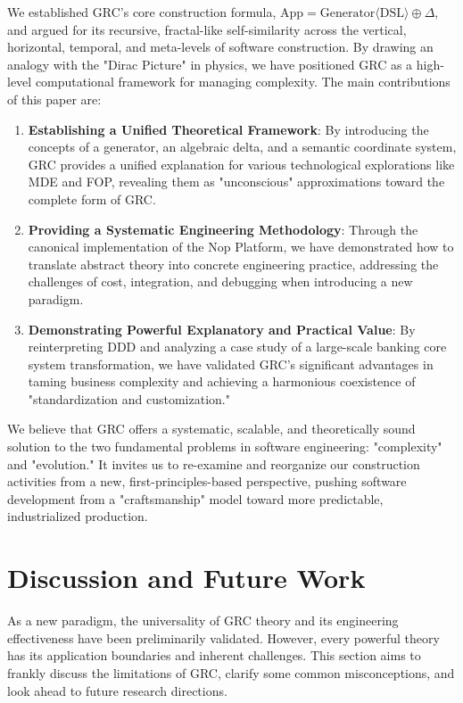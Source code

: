 \documentclass[11pt]{article}
\begin{document}
We established GRC's core construction formula, $\text{App} = \text{Generator}\langle\text{DSL}\rangle \oplus \Delta$, and argued for its recursive, fractal-like self-similarity across the vertical, horizontal, temporal, and meta-levels of software construction. By drawing an analogy with the "Dirac Picture" in physics, we have positioned GRC as a high-level computational framework for managing complexity. The main contributions of this paper are:

\begin{enumerate}
    \item \textbf{Establishing a Unified Theoretical Framework}: By introducing the concepts of a generator, an algebraic delta, and a semantic coordinate system, GRC provides a unified explanation for various technological explorations like MDE and FOP, revealing them as "unconscious" approximations toward the complete form of GRC.
    \item \textbf{Providing a Systematic Engineering Methodology}: Through the canonical implementation of the Nop Platform, we have demonstrated how to translate abstract theory into concrete engineering practice, addressing the challenges of cost, integration, and debugging when introducing a new paradigm.
    \item \textbf{Demonstrating Powerful Explanatory and Practical Value}: By reinterpreting DDD and analyzing a case study of a large-scale banking core system transformation, we have validated GRC's significant advantages in taming business complexity and achieving a harmonious coexistence of "standardization and customization."
\end{enumerate}

We believe that GRC offers a systematic, scalable, and theoretically sound solution to the two fundamental problems in software engineering: "complexity" and "evolution." It invites us to re-examine and reorganize our construction activities from a new, first-principles-based perspective, pushing software development from a "craftsmanship" model toward more predictable, industrialized production.

\section{Discussion and Future Work}

As a new paradigm, the universality of GRC theory and its engineering effectiveness have been preliminarily validated. However, every powerful theory has its application boundaries and inherent challenges. This section aims to frankly discuss the limitations of GRC, clarify some common misconceptions, and look ahead to future research directions.
\end{document}
